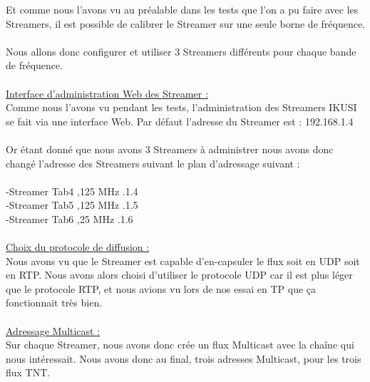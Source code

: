 \documentclass{report}
\begin{document}
   
    Et comme nous l’avons vu au préalable dans les tests que l’on a pu faire avec les Streamers, il est possible de calibrer le Streamer sur une seule borne de fréquence. 
    \\
    \\
    Nous allons donc configurer et utiliser 3 Streamers différents pour chaque bande de fréquence.
    \\
    \\
    
    \underline{Interface d’administration Web des Streamer :}\\
    
    Comme nous l’avons vu pendant les tests, l’administration des Streamers IKUSI se fait via une interface Web. Par défaut l’adresse du Streamer est : 192.168.1.4 
    \\
    \\
    Or étant donné que nous avons 3 Streamers à administrer nous avons donc changé l’adresse des Streamers suivant le plan d’adressage suivant :
    \\
    \\
    
    -Streamer Tab4  ,125 MHz .1.4
    \\
    
    -Streamer Tab5  ,125 MHz .1.5
    \\
    
    -Streamer Tab6  ,25 MHz .1.6
    \\
    \\
    
    \underline{Choix du protocole de diffusion :}\\
    
    Nous avons vu que le Streamer est capable d'en-capsuler le flux soit en UDP soit en RTP. Nous avons alors choisi d’utiliser le protocole UDP car il est plus léger que le protocole RTP, et nous avions vu lors de nos essai en TP que ça fonctionnait très bien.
    \\
    \\
    
    \underline{Adressage Multicast :}\\
    
    Sur chaque Streamer, nous avons donc crée un flux Multicast avec la chaîne qui nous intéressait. Nous avons donc au final, trois adresses Multicast, pour les trois flux TNT.\\
    
\end{document}
